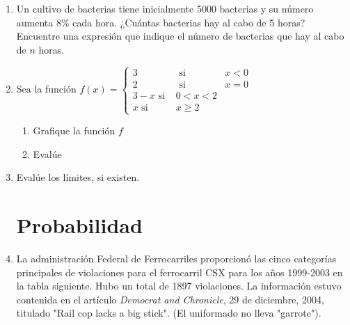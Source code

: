 \documentclass[10pt,twoside]{article}
\begin{document}
\begin{enumerate}
\item Un cultivo de bacterias tiene inicialmente 5000 bacterias y su número aumenta 8\% cada hora. ¿Cuántas bacterias hay al cabo de 5 horas? Encuentre una expresi\'{o}n que indique el n\'{u}mero de bacterias que hay al cabo de $n$ horas.
\item Sea la función $f(x)=\left\{\begin{array}{lcl}
3 & \mbox{ si } & x<0\\
2 & \mbox{ si } & x=0\\
3-x \mbox{ si } & 0<x<2\\
x \mbox{ si } & x\geq 2
\end{array}\right.$
\begin{enumerate}
\section*{L\'{i}mites}
\item Grafique la funci\'{o}n $f$
\item Eval\'{u}e
\begin{enumerate}
\end{enumerate}
\end{enumerate}
\item Evalúe los límites, si existen.
\begin{enumerate}
\end{enumerate}
\section*{Probabilidad}
\item La administración Federal de Ferrocarriles proporcionó las cinco categorías principales de violaciones para el ferrocarril CSX para los años 1999-2003 en la tabla siguiente. Hubo un total de 1897 violaciones. La información estuvo contenida en el artículo \textit{Democrat and Chronicle}, 29 de diciembre, 2004, titulado "Rail cop lacks a big stick". (El uniformado no lleva "garrote").


\end{enumerate}
\end{document}
